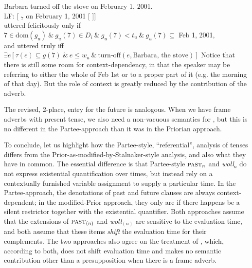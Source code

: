 \ex Barbara turned off the stove on February 1, 2001.\\
LF: [ \past$_{7}$ on February 1, 2001 [ ]]\\
uttered felicitously only if \\
\hfill
$7\in \text{dom}(g_{u})\ \&\ g_{u}(7)\in D_{i}\ \&\ g_{u}(7) < t_{u}\ \&\ g_{u}(7) \subseteq$
Feb 1, 2001,\\
and uttered truly iff $\exists e [\tau(e) \subseteq g(7)\ \&\ e \le w_{u}\ \& \
\text{turn-off}(e,\text{Barbara, the stove})]$
\xe
%
Notice that there is still some room for context-dependency, in that the speaker
may be referring to either the whole of Feb 1st or to a proper part of it (e.g.
the morning of that day). But the role of context is greatly reduced by the
contribution of the adverb.

The revised, 2-place, entry for the future is analogous. When we have frame
adverbs with present tense, we also need a non-vacuous semantics for \pres, but
this is no different in the Partee-approach than it was in the Priorian
approach.

To conclude, let us highlight how the Partee-style, ``referential'', analysis of
tenses differs from the Prior-as-modified-by-Stalnaker-style analysis, and also
what they have in common. The essential difference is that Partee-style
$\textsc{past}_{n}$ and \emph{woll}$_{n}$ do not express existential quantification over
times, but instead rely on a contextually furnished variable assignment to
supply a particular time. In the Partee-approach, the denotations of past and
future clauses are always context-dependent; in the modified-Prior approach,
they only are if there happens be a silent restrictor together with the
existential quantifier. Both approaches assume that the extensions of
$\textsc{past}_{(n)}$ and \emph{woll}$_{(n)}$ are sensitive to the evaluation time, and
both assume that these items \emph{shift} the evaluation time for their
complements. The two approaches also agree on the treatment of \pres, which,
according to both, does not shift evaluation time and makes no semantic
contribution other than a presupposition when there is a frame adverb.

